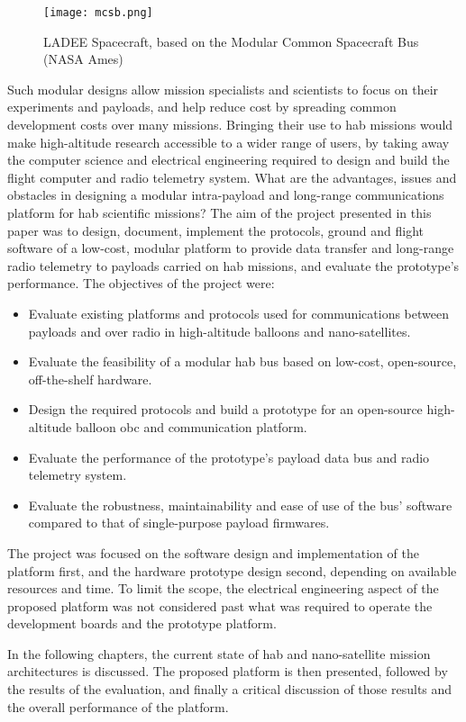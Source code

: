 \begin{figure}[H]
\texttt{[image: mcsb.png]}
\centering
\caption{LADEE Spacecraft, based on the Modular Common Spacecraft Bus (NASA
Ames)}
\end{figure}

Such modular designs allow mission specialists and scientists to focus on their experiments and payloads, and help reduce cost by spreading common development costs over many missions. Bringing their use to \acrshort{hab} missions would make high-altitude research accessible to a wider range of users, by taking away the computer science and electrical engineering required to design and build the flight computer and radio telemetry system.
\vskip 0.5cm
What are the advantages, issues and obstacles in designing a modular intra-payload and long-range communications platform for \acrlong{hab} scientific missions? The aim of the project presented in this paper was to design, document, implement the protocols, ground and flight software of a low-cost, modular platform to provide data transfer and long-range radio telemetry to payloads carried on \acrlong{hab} missions, and evaluate the prototype's performance. The objectives of the project were:

\begin{itemize}
\item Evaluate existing platforms and protocols used for communications between
payloads and over radio in high-altitude balloons and nano-satellites.

\item Evaluate the feasibility of a modular \acrlong{hab} bus based on low-cost, open-source, off-the-shelf hardware.

\item Design the required protocols and build a prototype for an open-source high-altitude balloon \acrlong{obc} and communication platform.

\item Evaluate the performance of the prototype's payload data bus and radio telemetry system.

\item Evaluate the robustness, maintainability and ease of use of the bus' software compared to that of single-purpose payload firmwares.
\end{itemize}

The project was focused on the software design and implementation of the platform first, and the hardware prototype design second, depending on available resources and time. To limit the scope, the electrical engineering aspect of the proposed platform was not considered past what was required to operate the development boards and the prototype platform.

In the following chapters, the current state of \acrlong{hab} and nano-satellite mission architectures is discussed. The proposed platform is then presented, followed by the results of the evaluation, and finally a critical discussion of those results and the overall performance of the platform.
